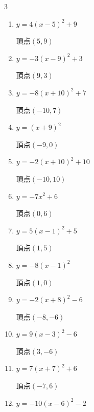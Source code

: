 \begin{multicols}{3}
\begin{enumerate}
  \item $\displaystyle y=4\left( x-5\right)^{2}+9$

        $\displaystyle 頂点\left( 5 , 9 \right)$

  \item $\displaystyle y=-3\left( x-9\right)^{2}+3$

        $\displaystyle 頂点\left( 9 , 3 \right)$

  \item $\displaystyle y=-8\left( x+10\right)^{2}+7$

        $\displaystyle 頂点\left( -10 , 7 \right)$

  \item $\displaystyle y=\left( x+9\right)^{2}$

        $\displaystyle 頂点\left( -9 , 0 \right)$

  \item $\displaystyle y=-2\left( x+10\right)^{2}+10$

        $\displaystyle 頂点\left( -10 , 10 \right)$

\columnbreak %

  \item $\displaystyle y=-7x^{2}+6$

        $\displaystyle 頂点\left( 0 , 6 \right)$

  \item $\displaystyle y=5\left( x-1\right)^{2}+5$

        $\displaystyle 頂点\left( 1 , 5 \right)$

  \item $\displaystyle y=-8\left( x-1\right)^{2}$

        $\displaystyle 頂点\left( 1 , 0 \right)$

  \item $\displaystyle y=-2\left( x+8\right)^{2}-6$

        $\displaystyle 頂点\left( -8 , -6 \right)$

  \item $\displaystyle y=9\left( x-3\right)^{2}-6$

        $\displaystyle 頂点\left( 3 , -6 \right)$

  \item $\displaystyle y=7\left( x+7\right)^{2}+6$

        $\displaystyle 頂点\left( -7 , 6 \right)$

  \item $\displaystyle y=-10\left( x-6\right)^{2}-2$


\end{enumerate}
\end{multicols}

